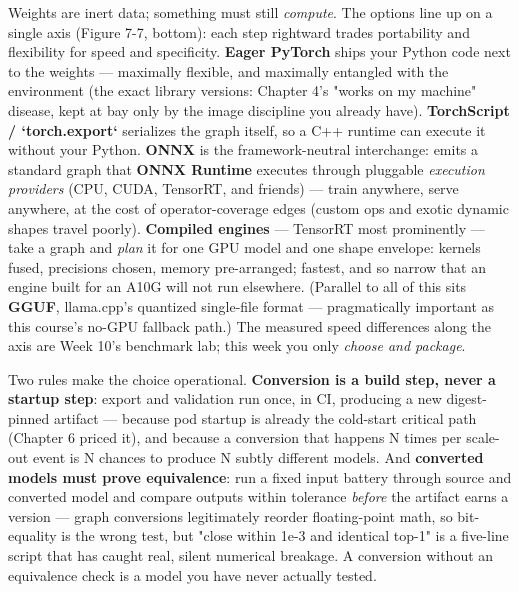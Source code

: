 Weights are inert data; something must still \textit{compute}. The options line up on a single axis (Figure 7-7, bottom): each step rightward trades portability and flexibility for speed and specificity. \textbf{Eager PyTorch} ships your Python code next to the weights — maximally flexible, and maximally entangled with the environment (the exact library versions: Chapter 4's "works on my machine" disease, kept at bay only by the image discipline you already have). \textbf{TorchScript / `torch.export`} serializes the graph itself, so a C++ runtime can execute it without your Python. \textbf{ONNX} is the framework-neutral interchange:  emits a standard graph that \textbf{ONNX Runtime} executes through pluggable \textit{execution providers} (CPU, CUDA, TensorRT, and friends) — train anywhere, serve anywhere, at the cost of operator-coverage edges (custom ops and exotic dynamic shapes travel poorly). \textbf{Compiled engines} — TensorRT most prominently — take a graph and \textit{plan} it for one GPU model and one shape envelope: kernels fused, precisions chosen, memory pre-arranged; fastest, and so narrow that an engine built for an A10G will not run elsewhere. (Parallel to all of this sits \textbf{GGUF}, llama.cpp's quantized single-file format — pragmatically important as this course's no-GPU fallback path.) The measured speed differences along the axis are Week 10's benchmark lab; this week you only \textit{choose and package}.

Two rules make the choice operational. \textbf{Conversion is a build step, never a startup step}: export and validation run once, in CI, producing a new digest-pinned artifact — because pod startup is already the cold-start critical path (Chapter 6 priced it), and because a conversion that happens N times per scale-out event is N chances to produce N subtly different models. And \textbf{converted models must prove equivalence}: run a fixed input battery through source and converted model and compare outputs within tolerance \textit{before} the artifact earns a version — graph conversions legitimately reorder floating-point math, so bit-equality is the wrong test, but "close within 1e-3 and identical top-1" is a five-line script that has caught real, silent numerical breakage. A conversion without an equivalence check is a model you have never actually tested.

